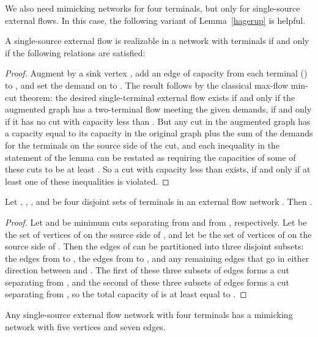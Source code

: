 \documentclass[runningheads]{llncs}
\begin{document}
We also need mimicking networks for four terminals, but only for single-source external flows.
In this case, the following variant of Lemma~\ref{hagerup} is helpful.

\begin{lemma}\label{ssmimic}
A single-source external flow  is realizable in a network  with terminals  if and only if the following relations are satisfied:

\end{lemma}

\begin{proof}
Augment  by a sink vertex , add an edge of capacity  from each terminal  () to , and set the demand on  to . The result follows by the classical max-flow min-cut theorem: the desired single-terminal external flow exists if and only if the augmented graph has a two-terminal flow meeting the given demands, if and only if it has no cut with capacity less than . But any cut in the augmented graph has a capacity equal to its capacity in the original graph plus the sum of the demands for the terminals on the source side of the cut, and each inequality in the statement of the lemma can be restated as requiring the capacities of some of these cuts to be at least . So a cut with capacity less than  exists, if and only if at least one of these inequalities is violated.
\end{proof}

\begin{lemma}
\label{four-way}
Let , , , and  be four disjoint sets of terminals in an external flow network . Then
.
\end{lemma}

\begin{proof}
Let  and  be minimum cuts separating  from  and  from , respectively. Let  be the set of vertices of  on the source side of , and let  be the set of vertices of  on the source side of . Then the edges of  can be partitioned into three disjoint subsets: the edges from  to , the edges from  to , and any remaining edges that go in either direction between  and . The first of these three subsets of edges forms a cut separating  from , and the second of these three subsets of edges forms a cut separating  from , so the total capacity of  is at least equal to .
\end{proof}

\begin{lemma}
\label{mimic4}
Any single-source external flow network with four terminals has a mimicking network with five vertices and seven edges.
\end{lemma}
\end{document}
